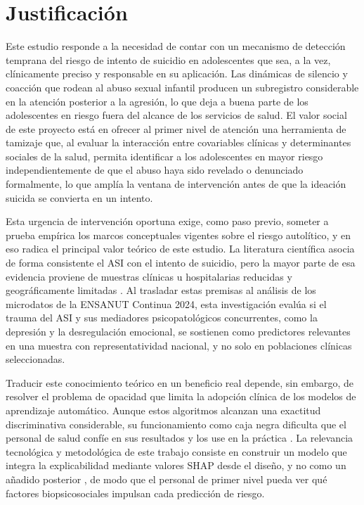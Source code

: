 \section{Justificación}

Este estudio responde a la necesidad de contar con un mecanismo de detección temprana del riesgo de intento de suicidio en adolescentes que sea, a la vez, clínicamente preciso y responsable en su aplicación. Las dinámicas de silencio y coacción que rodean al abuso sexual infantil producen un subregistro considerable en la atención posterior a la agresión, lo que deja a buena parte de los adolescentes en riesgo fuera del alcance de los servicios de salud. El valor social de este proyecto está en ofrecer al primer nivel de atención una herramienta de tamizaje que, al evaluar la interacción entre covariables clínicas y determinantes sociales de la salud, permita identificar a los adolescentes en mayor riesgo independientemente de que el abuso haya sido revelado o denunciado formalmente, lo que amplía la ventana de intervención antes de que la ideación suicida se convierta en un intento.

Esta urgencia de intervención oportuna exige, como paso previo, someter a prueba empírica los marcos conceptuales vigentes sobre el riesgo autolítico, y en eso radica el principal valor teórico de este estudio. La literatura científica asocia de forma consistente el ASI con el intento de suicidio, pero la mayor parte de esa evidencia proviene de muestras clínicas u hospitalarias reducidas y geográficamente limitadas \cite{brokkeEffectSexualAbuse2022,hebertUnveilingSuicidalRisk2025,suMachineLearningSuicide2020,walshPredictingSuicideAttempts2018}. Al trasladar estas premisas al análisis de los microdatos de la ENSANUT Continua 2024, esta investigación evalúa si el trauma del ASI y sus mediadores psicopatológicos concurrentes, como la depresión y la desregulación emocional, se sostienen como predictores relevantes en una muestra con representatividad nacional, y no solo en poblaciones clínicas seleccionadas.

Traducir este conocimiento teórico en un beneficio real depende, sin embargo, de resolver el problema de opacidad que limita la adopción clínica de los modelos de aprendizaje automático. Aunque estos algoritmos alcanzan una exactitud discriminativa considerable, su funcionamiento como caja negra dificulta que el personal de salud confíe en sus resultados y los use en la práctica \cite{tangAnalysisEvaluationExplainable2024,joyceExplainableArtificialIntelligence2023}. La relevancia tecnológica y metodológica de este trabajo consiste en construir un modelo que integra la explicabilidad mediante valores SHAP desde el diseño, y no como un añadido posterior \cite{nordinExplainableMachineLearning2022}, de modo que el personal de primer nivel pueda ver qué factores biopsicosociales impulsan cada predicción de riesgo.

